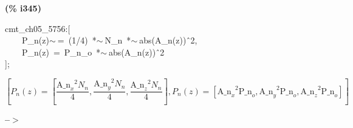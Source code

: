 \documentclass[fleqn]{article}
\begin{document}
\noindent
\begin{minipage}[t]{4.000000em}\color{red}\bfseries
(\% i345)	
\end{minipage}
\begin{minipage}[t]{\textwidth}\color{blue}
cmt\_ch05\_5756:[\\
\ \ \ \ P\_n(z)\ensuremath{\sim\ }=\ (1/4)\ *\ensuremath{\sim\ }N\_n\ *\ensuremath{\sim\ }abs(A\_n(z))\^\ 2,\\
\ \ \ \ P\_n(z)\ =\ P\_n\_o\ *\ensuremath{\sim\ }abs(A\_n(z))\^\ 2\\
];
\end{minipage}
\[\displaystyle \tag{\% o345} 
\operatorname{[}{P_n}(z)=\left[ \frac{{{{{\ensuremath{\mathrm{A\_ n}}}_x}}^{2}} {N_n}}{4}\operatorname{,}\frac{{{{{\ensuremath{\mathrm{A\_ n}}}_y}}^{2}} {N_n}}{4}\operatorname{,}\frac{{{{{\ensuremath{\mathrm{A\_ n}}}_z}}^{2}} {N_n}}{4}\right] \operatorname{,}{P_n}(z)=
\left[ {{{{\ensuremath{\mathrm{A\_ n}}}_x}}^{2}} {{\ensuremath{\mathrm{P\_ n}}}_o}\operatorname{,}{{{{\ensuremath{\mathrm{A\_ n}}}_y}}^{2}} {{\ensuremath{\mathrm{P\_ n}}}_o}\operatorname{,}{{{{\ensuremath{\mathrm{A\_ n}}}_z}}^{2}} {{\ensuremath{\mathrm{P\_ n}}}_o}\right] \operatorname{]}\mbox{}
\]


\noindent
\begin{minipage}[t]{4.000000em}\color{red}\bfseries
 --\ensuremath{\ensuremath{>}}	
\end{minipage}
\begin{minipage}[t]{\textwidth}\color{blue}

\end{minipage}

\noindent%
\end{document}
